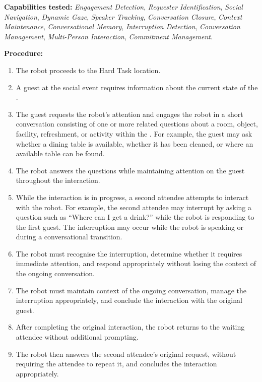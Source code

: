 \medskip
\noindent \textbf{Capabilities tested:}
\emph{Engagement Detection}, \emph{Requester Identification}, \emph{Social Navigation}, \emph{Dynamic Gaze}, \emph{Speaker Tracking}, \emph{Conversation Closure}, \emph{Context Maintenance}, \emph{Conversational Memory}, \emph{Interruption Detection}, \emph{Conversation Management}, \emph{Multi-Person Interaction}, \emph{Commitment Management}.

\medskip
\noindent \textbf{Procedure:}
\begin{enumerate}[nosep]
	\item The robot proceeds to the Hard Task location.
	\item A guest at the social event requires information about the current state of the \Arena{}.
	\item The guest requests the robot's attention and engages the robot in a short conversation consisting of one or more related questions about a room, object, facility, refreshment, or activity within the \Arena{}. For example, the guest may ask whether a dining table is available, whether it has been cleaned, or where an available table can be found.
	\item The robot answers the questions while maintaining attention on the guest throughout the interaction.
	\item While the interaction is in progress, a second attendee attempts to interact with the robot. For example, the second attendee may interrupt by asking a question such as ``Where can I get a drink?'' while the robot is responding to the first guest. The interruption may occur while the robot is speaking or during a conversational transition.
	\item The robot must recognise the interruption, determine whether it requires immediate attention, and respond appropriately without losing the context of the ongoing conversation.
	\item The robot must maintain context of the ongoing conversation, manage the interruption appropriately, and conclude the interaction with the original guest.
	\item After completing the original interaction, the robot returns to the waiting attendee without additional prompting.
	\item The robot then answers the second attendee's original request, without requiring the attendee to repeat it, and concludes the interaction appropriately.
\end{enumerate}

